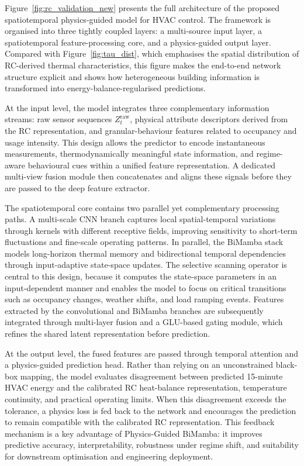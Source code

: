 \documentclass[11pt]{article}
\begin{document}
Figure~\ref{fig:rc_validation_new} presents the full architecture of the proposed spatiotemporal physics-guided model for HVAC control. The framework is organised into three tightly coupled layers: a multi-source input layer, a spatiotemporal feature-processing core, and a physics-guided output layer. Compared with Figure~\ref{fig:tau_dist}, which emphasises the spatial distribution of RC-derived thermal characteristics, this figure makes the end-to-end network structure explicit and shows how heterogeneous building information is transformed into energy-balance-regularised predictions.

At the input level, the model integrates three complementary information streams: raw sensor sequences $Z_t^{\mathrm{raw}}$, physical attribute descriptors derived from the RC representation, and granular-behaviour features related to occupancy and usage intensity. This design allows the predictor to encode instantaneous measurements, thermodynamically meaningful state information, and regime-aware behavioural cues within a unified feature representation. A dedicated multi-view fusion module then concatenates and aligns these signals before they are passed to the deep feature extractor.

The spatiotemporal core contains two parallel yet complementary processing paths. A multi-scale CNN branch captures local spatial-temporal variations through kernels with different receptive fields, improving sensitivity to short-term fluctuations and fine-scale operating patterns. In parallel, the BiMamba stack models long-horizon thermal memory and bidirectional temporal dependencies through input-adaptive state-space updates. The selective scanning operator is central to this design, because it computes the state-space parameters in an input-dependent manner and enables the model to focus on critical transitions such as occupancy changes, weather shifts, and load ramping events. Features extracted by the convolutional and BiMamba branches are subsequently integrated through multi-layer fusion and a GLU-based gating module, which refines the shared latent representation before prediction.

At the output level, the fused features are passed through temporal attention and a physics-guided prediction head. Rather than relying on an unconstrained black-box mapping, the model evaluates disagreement between predicted 15-minute HVAC energy and the calibrated RC heat-balance representation, temperature continuity, and practical operating limits. When this disagreement exceeds the tolerance, a physics loss is fed back to the network and encourages the prediction to remain compatible with the calibrated RC representation. This feedback mechanism is a key advantage of Physics-Guided BiMamba: it improves predictive accuracy, interpretability, robustness under regime shift, and suitability for downstream optimisation and engineering deployment.
\end{document}
